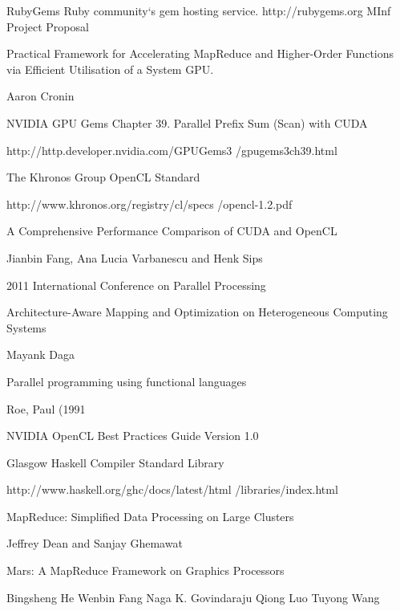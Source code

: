 \documentclass[12pt,a4paper,twocolumn] {scrreprt}   %
\begin{document}
\begin{thebibliography}{9}

\thispagestyle{empty}
\pagestyle{empty}
  RubyGems
  Ruby community`s gem hosting service.
  http://rubygems.org
    MInf Project Proposal

    Practical Framework for Accelerating MapReduce and Higher-Order Functions via Efficient Utilisation of a System GPU.

    Aaron Cronin

    NVIDIA GPU Gems
    Chapter 39. Parallel Prefix Sum (Scan) with CUDA

    http://http.developer.nvidia.com/GPUGems3
    /gpugems\textunderscore3ch39.html

    The Khronos Group OpenCL Standard

    http://www.khronos.org/registry/cl/specs
    /opencl-1.2.pdf

    A Comprehensive Performance Comparison of
    CUDA and OpenCL

    Jianbin Fang, Ana Lucia Varbanescu and Henk Sips

    2011 International Conference on Parallel Processing

    Architecture-Aware Mapping and Optimization on Heterogeneous Computing Systems

    Mayank Daga

    Parallel programming using functional languages

    Roe, Paul (1991

    NVIDIA OpenCL Best Practices Guide Version 1.0

    Glasgow Haskell Compiler Standard Library

    http://www.haskell.org/ghc/docs/latest/html
    /libraries/index.html

    MapReduce: Simplified Data Processing on Large Clusters

    Jeffrey Dean and Sanjay Ghemawat

  Mars: A MapReduce Framework on Graphics Processors

  Bingsheng He Wenbin Fang Naga K. Govindaraju Qiong Luo Tuyong Wang

\thispagestyle{empty}
\pagestyle{empty}
\end{thebibliography}
\end{document}
